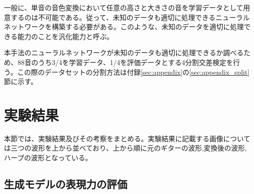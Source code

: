 一般に、単音の音色変換において任意の高さと大きさの音を学習データとして用意するのは不可能である。従って、未知のデータも適切に処理できるニューラルネットワークを構築する必要がある。このような、未知のデータを適切に処理できる能力のことを汎化能力と呼ぶ。

本手法のニューラルネットワークが未知のデータも適切に処理できるか調べるため、88音のうち3/4を学習データ、1/4を評価データとする4分割交差検定を行う。この際のデータセットの分割方法は付録\ref{sec:appendix}の\ref{sec:appendix_split}節に示す。

\section{実験結果}

本節では、実験結果及びその考察をまとめる。実験結果に記載する画像については三つの波形を上から並べており、上から順に元のギターの波形,変換後の波形,ハープの波形となっている。


\subsection{生成モデルの表現力の評価}
\label{sec:expression}

